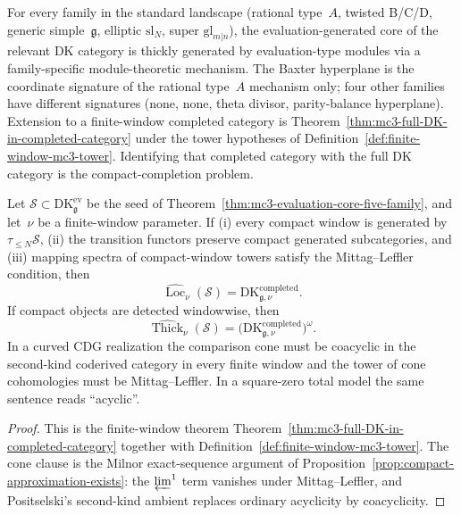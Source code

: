 \begin{remark}
\label{rem:mc3-scope-qualified}
For every family in the standard landscape (rational type~$A$,
twisted B/C/D, generic simple~$\mathfrak{g}$, elliptic
$\mathrm{sl}_N$, super $\mathrm{gl}_{m|n}$), the evaluation-generated
core of the relevant DK category is thickly generated by
evaluation-type modules via a family-specific module-theoretic
mechanism. The Baxter hyperplane is the coordinate signature of
the rational type~$A$ mechanism only; four other families have
different signatures \textup{(}none, none, theta divisor,
parity-balance hyperplane\textup{)}.
Extension to a finite-window completed category is
Theorem~\ref{thm:mc3-full-DK-in-completed-category} under the tower
hypotheses of Definition~\ref{def:finite-window-mc3-tower}.
Identifying that completed category with the full DK category is the
compact-completion problem.
\end{remark}

\begin{proposition}
\label{prop:mc3-finite-window-upgrade-boundary}
%
Let $\mathcal S\subset\mathrm{DK}^{\mathrm{ev}}_{\mathfrak g}$ be the
seed of
Theorem~\ref{thm:mc3-evaluation-core-five-family}, and let~$\nu$ be a
finite-window parameter. If
\textup{(i)} every compact window is generated by
$\tau_{\le N}\mathcal S$,
\textup{(ii)} the transition functors preserve compact generated
subcategories, and
\textup{(iii)} mapping spectra of compact-window towers satisfy the
Mittag--Leffler condition, then
\[
 \widehat{\operatorname{Loc}}_\nu(\mathcal S)
 =
 \mathrm{DK}^{\mathrm{completed}}_{\mathfrak g,\nu}.
\]
If compact objects are detected windowwise, then
\[
 \widehat{\operatorname{Thick}}_\nu(\mathcal S)
 =
 \bigl(\mathrm{DK}^{\mathrm{completed}}_{\mathfrak g,\nu}\bigr)^\omega .
\]
In a curved CDG realization the comparison cone must be coacyclic in
the second-kind coderived category in every finite window and the tower
of cone cohomologies must be Mittag--Leffler. In a square-zero total
model the same sentence reads ``acyclic''.
\end{proposition}

\begin{proof}
This is the finite-window theorem
Theorem~\ref{thm:mc3-full-DK-in-completed-category} together with
Definition~\ref{def:finite-window-mc3-tower}. The cone clause is the
Milnor exact-sequence argument of
Proposition~\ref{prop:compact-approximation-exists}: the
$\varprojlim^1$ term vanishes under Mittag--Leffler, and Positselski's
second-kind ambient replaces ordinary acyclicity by coacyclicity.
\end{proof}

